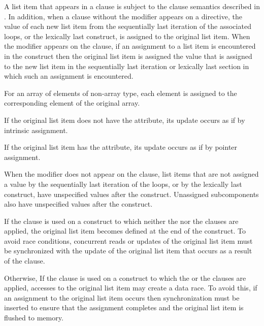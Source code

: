 A list item that appears in a  clause is subject to the  clause
semantics described in
.
In addition, when a
 clause without the  modifier appears on a directive,
the value of each new list item from the sequentially last iteration
of the associated loops, or the lexically last  construct, is assigned to the
original list item. When the  modifier appears on the clause,
if an assignment to a list item is encountered in the construct then the
original list item is assigned the value that is assigned to the new list item
in the sequentially last iteration or lexically last section in which such an
assignment is encountered.


\begin{ccppspecific}
For an array of elements of non-array type, each element is assigned to the
corresponding element of the original array.
\end{ccppspecific}
%
\begin{fortranspecific}
If the original list item does not have the  attribute, its update occurs as if by
intrinsic assignment.

If the original list item has the  attribute, its update occurs as if by pointer
assignment.
\end{fortranspecific}

When the  modifier does not appear on the  clause, list items that are not
assigned a value by the sequentially last iteration of the loops, or by the
lexically last  construct, have unspecified values after the
construct.  Unassigned subcomponents also have unspecified values after the
construct.

If the  clause is used on a construct to which neither
the  nor the  clauses are applied, the original list item
becomes defined at the end of the construct.  To avoid race conditions,
concurrent reads or updates of the original list item must be synchronized with
the update of the original list item that occurs as a result of the
 clause.

Otherwise, If the  clause is used on a construct to which
the  or the  clauses are applied, accesses to the original
list item may create a data race.  To avoid this, if an assignment to the
original list item occurs then synchronization must be inserted to ensure that
the assignment completes and the original list item is flushed to memory.


